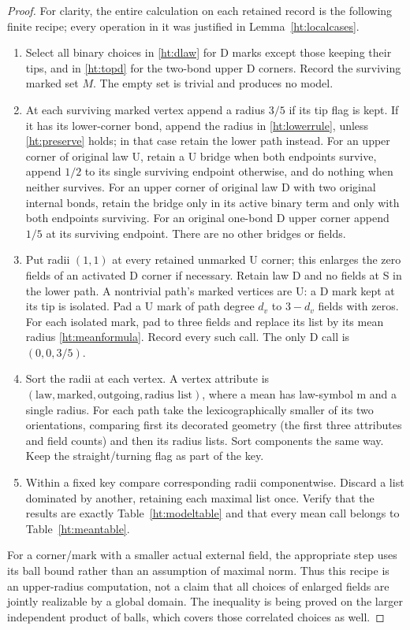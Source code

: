 \begin{proof}
For clarity, the entire calculation on each retained record is the
following finite recipe; every operation in it was justified in
Lemma~\ref{ht:localcases}.
\begin{enumerate}
\item Select all binary choices in \eqref{ht:dlaw} for D marks except
those keeping their tips, and in \eqref{ht:topd} for the two-bond upper
D corners. Record the surviving marked set \(M\). The empty set is
trivial and produces no model.
\item At each surviving marked vertex append a radius \(3/5\) if its
tip flag is kept. If it has its lower-corner bond, append the radius
in \eqref{ht:lowerrule}, unless \eqref{ht:preserve} holds; in that case
retain the lower path instead. For an upper corner of original law U,
retain a U bridge when both endpoints survive, append \(1/2\) to its
single surviving endpoint otherwise, and do nothing when neither
survives. For an upper corner of original law D with two original
internal bonds, retain the bridge only in its active binary term and
only with both endpoints surviving. For an original one-bond D upper
corner append \(1/5\) at its surviving endpoint. There are no other
bridges or fields.
\item Put radii \((1,1)\) at every retained unmarked U corner;
this enlarges the zero fields of an activated D corner if necessary.
Retain law D and no fields at S in the lower path. A nontrivial path's
marked vertices are U: a D mark kept at its tip is isolated. Pad a U
mark of path degree \(d_v\) to \(3-d_v\) fields with zeros. For each
isolated mark, pad to three fields and replace its list by its mean
radius \eqref{ht:meanformula}. Record every such call. The only D
call is \((0,0,3/5)\).
\item Sort the radii at each vertex. A vertex attribute is
\((\text{law},\text{marked},\text{outgoing},\text{radius list})\),
where a mean has law-symbol m and a single radius. For each path take
the lexicographically smaller of its two orientations, comparing first
its decorated geometry (the first three attributes and field counts)
and then its radius lists. Sort components the same way. Keep the
straight/turning flag as part of the key.
\item Within a fixed key compare corresponding radii componentwise.
Discard a list dominated by another, retaining each maximal list once.
Verify that the results are exactly Table~\ref{ht:modeltable} and that
every mean call belongs to Table~\ref{ht:meantable}.
\end{enumerate}
For a corner/mark with a smaller actual external field, the appropriate
step uses its ball bound rather than an assumption of maximal norm.
Thus this recipe is an upper-radius computation, not a claim that all
choices of enlarged fields are jointly realizable by a global domain.
The inequality is being proved on the larger independent product of
balls, which covers those correlated choices as well.


\end{proof}
